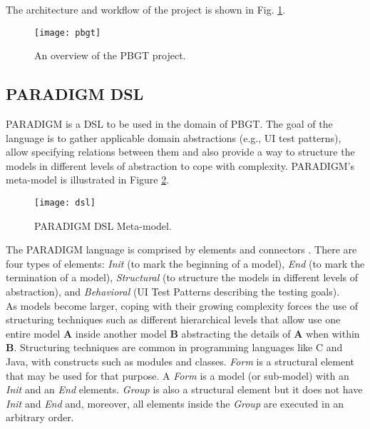 The architecture and workflow of the project is shown in Fig. \ref{fig:pbgt}.\\

\begin{center}
\begin{figure}[!htb]
\centering
\texttt{[image: pbgt]}
\caption{An overview of the PBGT project.}
\label{fig:pbgt}
\end{figure}
\end{center}

\subsection{PARADIGM DSL}\label{sec:dsl}

PARADIGM is a DSL to be used in the domain of PBGT. The goal of the language is to gather applicable domain abstractions (e.g., UI test patterns), allow specifying relations between them and also provide a way to structure the models in different levels of abstraction to cope with complexity. PARADIGM's meta-model is illustrated in Figure \ref{fig:dsl}.\\

\begin{center}
\begin{figure}[!htb]
\centering
\texttt{[image: dsl]}
\caption{PARADIGM DSL Meta-model.}
\label{fig:dsl}
\end{figure}
\end{center}

The PARADIGM language is comprised by elements and connectors \cite{moreira2013pattern}. There are four types of elements: \textit{Init} (to mark the beginning of a model), \textit{End} (to mark the termination of a model), \textit{Structural} (to structure the models in different levels of abstraction), and \textit{Behavioral} (UI Test Patterns describing the testing goals).\\

As models become larger, coping with their growing complexity forces the use of structuring techniques such as different hierarchical levels that allow use one entire model \textbf{A} inside another model \textbf{B} abstracting the details of \textbf{A} when within \textbf{B}. Structuring techniques are common in programming languages like C and Java, with constructs such as modules and classes. \textit{Form} is a structural element that may be used for that purpose. A \textit{Form} is a model (or sub-model) with an \textit{Init} and an \textit{End} elements. \textit{Group} is also a structural element but it does not have \textit{Init} and \textit{End} and, moreover, all elements inside the \textit{Group} are executed in an arbitrary order.\\

